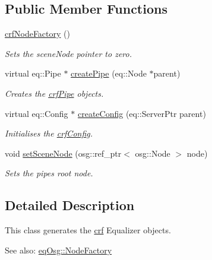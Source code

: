 \subsection*{Public Member Functions}
\begin{CompactItemize}
\item 
\hypertarget{a00005_1361d01b702cda3adc2dc149fd4b9e58}{
\hyperlink{a00005_1361d01b702cda3adc2dc149fd4b9e58}{crfNodeFactory} ()}
\label{a00005_1361d01b702cda3adc2dc149fd4b9e58}

\begin{CompactList}\small\item\em Sets the sceneNode pointer to zero. \item\end{CompactList}\item 
virtual eq::Pipe $\ast$ \hyperlink{a00005_5f35c307f323b385869226c6083df93d}{createPipe} (eq::Node $\ast$parent)
\begin{CompactList}\small\item\em Creates the \hyperlink{a00006}{crfPipe} objects. \item\end{CompactList}\item 
virtual eq::Config $\ast$ \hyperlink{a00005_0b7b562ae3d0ccc5a98017195926057f}{createConfig} (eq::ServerPtr parent)
\begin{CompactList}\small\item\em Initialises the \hyperlink{a00004}{crfConfig}. \item\end{CompactList}\item 
void \hyperlink{a00005_52740ca913279f9cbdfc4a10f55b691d}{setSceneNode} (osg::ref\_\-ptr$<$ osg::Node $>$ node)
\begin{CompactList}\small\item\em Sets the pipes root node. \item\end{CompactList}\end{CompactItemize}


\subsection{Detailed Description}
This class generates the \hyperlink{a00043}{crf} Equalizer objects. 

\begin{Desc}
\item[See also:]\hyperlink{a00013}{eqOsg::NodeFactory} \end{Desc}


